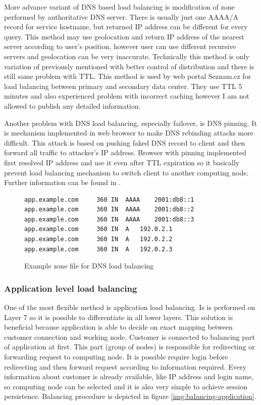 More advance variant of \Ac{DNS} based load balancing is modification of zone performed by authoritative \Ac{DNS} server. There is usually just one AAAA/A record for service hostname, but returned \Ac{IP} address can be different for every query. This method may use geolocation and return \Ac{IP} address of the nearest server according to user's position, however user can use different recursive servers and geolocation can be very inaccurate. Technically this method is only variation of previously mentioned with better control of distribution and there is still same problem with \Ac{TTL}. This method is used by web portal Seznam.cz for load balancing between primary and secondary data center. They use \Ac{TTL} 5 minutes and also experienced problem with incorrect caching however I am not allowed to publish any detailed information.

Another problem with DNS load balancing, especially failover, is \Ac{DNS} pinning. It is mechanism implemented in web browser to make \Ac{DNS} rebinding attacks more difficult. This attack is based on pushing faked \Ac{DNS} record to client and then forward all traffic to attacker's \Ac{IP} address. Browser with pinning implemented  first resolved \Ac{IP} address and use it even after \Ac{TTL} expiration so it basically prevent load balancing mechanism to switch client to another computing node. Further information can be found in \cite{dns-pinning}.

\begin{figure}[htb]
\caption{Example zone file for DNS load balancing}
\label{code:zone}
\begin{lstlisting}
app.example.com 	360	IN 	AAAA 	2001:db8::1
app.example.com 	360	IN 	AAAA	2001:db8::2
app.example.com 	360	IN 	AAAA	2001:db8::3
app.example.com		360	IN 	A	192.0.2.1
app.example.com		360	IN 	A	192.0.2.2
app.example.com		360	IN 	A	192.0.2.3
\end{lstlisting}
\end{figure}

\subsubsection{Application level load balancing}
One of the most flexible method is application load balancing. Is is performed on Layer 7 so it is possible to differentiate in all lower layers. This solution is beneficial because application is able to decide on exact mapping between customer connection and working node. 
Customer is connected to balancing part of application at first. This part (group of nodes) is responsible for redirecting or forwarding request to computing node. It is possible require login before redirecting and then forward request according to information required. Every information about customer is already available, like \Ac{IP} address and login name, so computing node can be selected and it is also very simple to achieve session persistence. Balancing procedure is depicted in figure \ref{img:balancing-application}.

